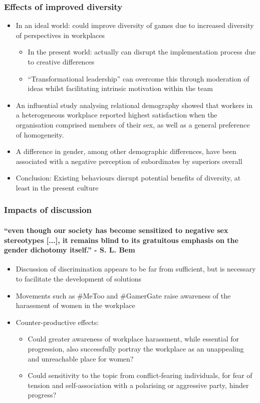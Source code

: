 \documentclass{beamer}
\begin{document}
\begin{frame}
	\frametitle{Effects of improved diversity}
	\begin{itemize}
		\item In an ideal world: could improve diversity of games due to increased diversity of perspectives in workplaces
		\begin{itemize}
			\item In the present world: actually can disrupt the implementation process due to creative differences \cite{harvey_diversity_2013}
			\item ``Transformational leadership'' can overcome this through moderation of ideas whilst facilitating intrinsic motivation within the team \cite{wang_transformational_2016}
		\end{itemize}
		\item An influential study analysing relational demography \cite{being_different} showed that workers in a heterogeneous workplace reported highest satisfaction when the organisation comprised members of their sex, as well as a general preference of homogeneity.
		\item A difference in gender, among other demographic differences, have been associated with a negative perception of subordinates by superiors overall \cite{subordinates}
		\item Conclusion: Existing behaviours disrupt potential benefits of diversity, at least in the present culture
	\end{itemize}
\end{frame}

\begin{frame}
\frametitle{Impacts of discussion}
\framesubtitle{``even though our society has become sensitized to negative sex stereotypes [...], it remains blind to its gratuitous emphasis on the gender dichotomy itself.'' - S. L. Bem \cite{gender_schema}}
\begin{itemize}
	\item Discussion of discrimination appears to be far from sufficient, but is necessary to facilitate the development of solutions
	\item Movements such as \#MeToo and \#GamerGate raise awareness of the harassment of women in the workplace
	\item Counter-productive effects:
	\begin{itemize}
		\item Could greater awareness of workplace harassment, while essential for progression, also successfully portray the workplace as an unappealing and unreachable place for women?
		\item Could sensitivity to the topic from conflict-fearing individuals, for fear of tension and self-association with a polarising or aggressive party, hinder progress?
	\end{itemize}
\end{itemize}
\end{frame}
\end{document}

